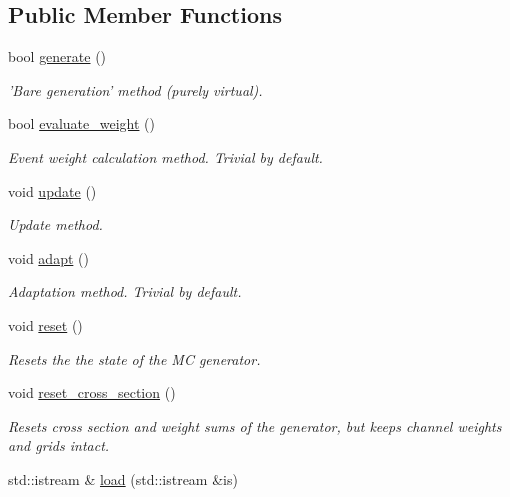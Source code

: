 \subsection*{Public Member Functions}
\begin{DoxyCompactItemize}
\item 
bool \hyperlink{a00395_a23098c7456702cce4946d0d787f5bf37}{generate} ()
\begin{DoxyCompactList}\small\item\em 'Bare generation' method (purely virtual). \end{DoxyCompactList}\item 
\hypertarget{a00395_a1c398ce4d7dd1aed47752d2391ae11df}{bool \hyperlink{a00395_a1c398ce4d7dd1aed47752d2391ae11df}{evaluate\-\_\-weight} ()}\label{a00395_a1c398ce4d7dd1aed47752d2391ae11df}

\begin{DoxyCompactList}\small\item\em Event weight calculation method. Trivial by default. \end{DoxyCompactList}\item 
void \hyperlink{a00395_a40cc397db66b0451b6135c80645e50b9}{update} ()
\begin{DoxyCompactList}\small\item\em Update method. \end{DoxyCompactList}\item 
\hypertarget{a00395_a02d5211d206546de42ec20bbfbf6ecef}{void \hyperlink{a00395_a02d5211d206546de42ec20bbfbf6ecef}{adapt} ()}\label{a00395_a02d5211d206546de42ec20bbfbf6ecef}

\begin{DoxyCompactList}\small\item\em Adaptation method. Trivial by default. \end{DoxyCompactList}\item 
void \hyperlink{a00395_acc228746623bfc5c6f3f1d62f3a841e6}{reset} ()
\begin{DoxyCompactList}\small\item\em Resets the the state of the M\-C generator. \end{DoxyCompactList}\item 
void \hyperlink{a00395_afde27e92b24ade585d066329f1181089}{reset\-\_\-cross\-\_\-section} ()
\begin{DoxyCompactList}\small\item\em Resets cross section and weight sums of the generator, but keeps channel weights and grids intact. \end{DoxyCompactList}\item 
\hypertarget{a00395_a55efdbc227d118580d2e4d02db4d7cc3}{std\-::istream \& \hyperlink{a00395_a55efdbc227d118580d2e4d02db4d7cc3}{load} (std\-::istream \&is)}\label{a00395_a55efdbc227d118580d2e4d02db4d7cc3}


\end{DoxyCompactItemize}
